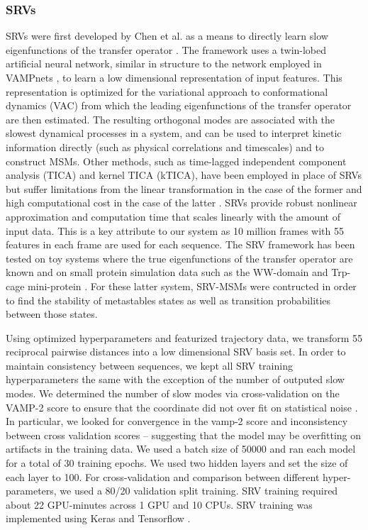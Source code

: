 \documentclass[journal=jpcbfk,manuscript=article]{achemso}
\begin{document}

\subsubsection{\label{sec:methods}SRVs}
 
SRVs were first developed by Chen et al. as a means to directly learn slow eigenfunctions of the transfer operator \citep{Chen}. The framework uses a twin-lobed artificial neural network, similar in structure to the network employed in VAMPnets \citep{Mardt2018VAMPnetsKinetics}, to learn a low dimensional representation of input features. This representation is optimized for the variational approach to conformational dynamics (VAC) from which the leading eigenfunctions of the transfer operator are then estimated. The resulting orthogonal modes are associated with the slowest dynamical processes in a system, and can be used to interpret kinetic information directly (such as physical correlations and timescales) and to construct MSMs. Other methods, such as time-lagged independent component analysis (TICA) and kernel TICA (kTICA), have been employed in place of SRVs but suffer limitations from the linear transformation in the case of the former and high computational cost in the case of the latter \citep{Molgedey1994SeparationCorrelations, Harrigan2017LandmarkDynamics}. SRVs provide robust nonlinear approximation and computation time that scales linearly with the amount of input data. This is a key attribute to our system as 10 million frames with 55 features in each frame are used for each sequence. The SRV framework has been tested on toy systems where the true eigenfunctions of the transfer operator are known and on small protein simulation data such as the WW-domain and Trp-cage mini-protein \citep{Chen, Sidky}. For these latter system, SRV-MSMs were contructed in order to find the stability of metastables states as well as transition probabilities between those states.


Using optimized hyperparameters and featurized trajectory data, we transform 55 reciprocal pairwise distances into a low dimensional SRV basis set. In order to maintain consistency between sequences, we kept all SRV training hyperparameters the same with the exception of the number of outputed slow modes. We determined the number of slow modes via cross-validation on the VAMP-2 score to ensure that the coordinate did not over fit on statistical noise \citep{McGibbon2015VariationalKinetics}. In particular, we looked for convergence in the vamp-2 score and inconsistency between cross validation scores -- suggesting that the model may be overfitting on artifacts in the training data. We used a batch size of 50000 and ran each model for a total of 30 training epochs. We used two hidden layers and set the size of each layer to 100. For cross-validation and comparison between different hyper-parameters, we used a 80/20 validation split training. SRV training required about 22 GPU-minutes across 1 GPU and 10 CPUs. SRV training was implemented using Keras and Tensorflow \citep{KerasGithub.Com, Abadi2016TensorFlow:Systems}.
\end{document}
